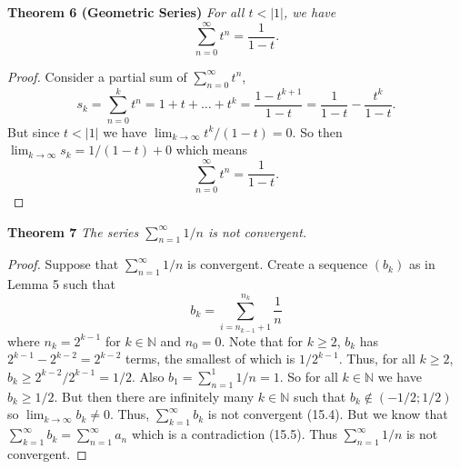 \documentclass{article}
\begin{document}
\begin{flushleft}
\textbf{Theorem 6 (Geometric Series)}
\textsl{For all $t < |1|$, we have
\[
\sum_{n=0}^{\infty} t^n = \frac{1}{1-t}.
\]}
\begin{proof}
Consider a partial sum of $\sum_{n=0}^{\infty} t^n$,
\[
s_k = \sum_{n=0}^{k} t^n= 1+t+\dots+t^k = \frac{1-t^{k+1}}{1-t} = \frac{1}{1-t} - \frac{t^k}{1-t}.
\]
But since $t < |1|$ we have $\lim_{k \rightarrow \infty} t^k/(1-t) = 0$. So then $\lim_{k \rightarrow \infty} s_k = 1/(1-t) + 0$ which means
\[
\sum_{n=0}^{\infty} t^n = \frac{1}{1-t}.
\]
\end{proof}

\textbf{Theorem 7}
\textsl{The series $\sum_{n=1}^{\infty} 1/n$ is not convergent.}
\begin{proof}
Suppose that $\sum_{n=1}^{\infty} 1/n$ is convergent. Create a sequence $(b_k)$ as in Lemma 5 such that
\[
b_k = \sum_{i = n_{k-1} + 1}^{n_k} \frac{1}{n}
\]
where $n_k = 2^{k-1}$ for $k \in \mathbb{N}$ and $n_0 = 0$. Note that for $k \geq 2$, $b_k$ has $2^{k-1} - 2^{k-2} = 2^{k-2}$ terms, the smallest of which is $1/2^{k-1}$. Thus, for all $k \geq 2$, $b_k \geq 2^{k-2}/2^{k-1} = 1/2$. Also $b_1 = \sum_{n=1}^{1} 1/n = 1$. So for all $k \in \mathbb{N}$ we have $b_k \geq 1/2$. But then there are infinitely many $k \in \mathbb{N}$ such that $b_k \notin (-1/2 ; 1/2)$ so $\lim_{k \rightarrow \infty} b_k \neq 0$. Thus, $\sum_{k=1}^{\infty} b_k$ is not convergent (15.4). But we know that $\sum_{k=1}^{\infty} b_k = \sum_{n=1}^{\infty} a_n$ which is a contradiction (15.5). Thus $\sum_{n=1}^{\infty} 1/n$ is not convergent.
\end{proof}


\end{flushleft}
\end{document}
